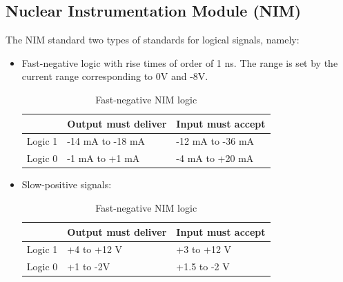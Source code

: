 \subsection{Nuclear Instrumentation Module (NIM)}
The NIM standard two types of standards for logical signals, namely:
\begin{itemize}
\item Fast-negative logic with rise times of order of 1 ns. The range is set
  by the current range corresponding to 0V and -8V.
  \begin{table}[H]
    \centering
    \begin{tabular}{l l l}
      \hline
      & \textbf{Output must deliver} & \textbf{Input must accept} \\
      \hline
      Logic 1 & -14 mA to -18 mA & -12 mA to -36 mA \\
      Logic 0 & -1 mA to +1 mA & -4 mA to +20 mA \\
      \hline
    \end{tabular}
    \caption{Fast-negative NIM logic}
  \end{table}
\item Slow-positive signals:
  \begin{table}[H]
    \centering
    \begin{tabular}{l l l}
      \hline
      & \textbf{Output must deliver} & \textbf{Input must accept} \\
      \hline
      Logic 1 & +4 to +12 V & +3 to +12 V \\
      Logic 0 & +1 to -2V & +1.5 to -2 V \\
      \hline
    \end{tabular}
    \caption{Fast-negative NIM logic}
  \end{table}
\end{itemize}

